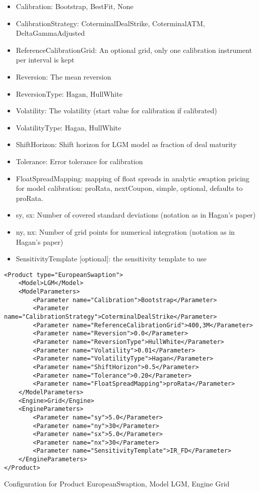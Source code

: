 \begin{itemize}
\item Calibration: Bootstrap, BestFit, None
\item CalibrationStrategy: CoterminalDealStrike, CoterminalATM, DeltaGammaAdjusted
\item ReferenceCalibrationGrid: An optional grid, only one calibration instrument per interval is kept
\item Reversion: The mean reversion
\item ReversionType: Hagan, HullWhite
\item Volatility: The volatility (start value for calibration if calibrated)
\item VolatilityType: Hagan, HullWhite
\item ShiftHorizon: Shift horizon for LGM model as fraction of deal maturity
\item Tolerance: Error tolerance for calibration
\item FloatSpreadMapping: mapping of float spreads in analytic swaption pricing for model calibration: proRata,
  nextCoupon, simple, optional, defaults to proRata.
\item sy, sx: Number of covered standard deviations (notation as in Hagan's paper)
\item ny, nx: Number of grid points for numerical integration (notation as in Hagan's paper)
\item SensitivityTemplate [optional]: the sensitivity template to use 
\end{itemize}

\begin{longlisting}
\begin{verbatim}
<Product type="EuropeanSwaption">
    <Model>LGM</Model>
    <ModelParameters>
        <Parameter name="Calibration">Bootstrap</Parameter>
        <Parameter name="CalibrationStrategy">CoterminalDealStrike</Parameter>
        <Parameter name="ReferenceCalibrationGrid">400,3M</Parameter>
        <Parameter name="Reversion">0.0</Parameter>
        <Parameter name="ReversionType">HullWhite</Parameter>
        <Parameter name="Volatility">0.01</Parameter>
        <Parameter name="VolatilityType">Hagan</Parameter>
        <Parameter name="ShiftHorizon">0.5</Parameter>
        <Parameter name="Tolerance">0.20</Parameter>
        <Parameter name="FloatSpreadMapping">proRata</Parameter>
    </ModelParameters>
    <Engine>Grid</Engine>
    <EngineParameters>
        <Parameter name="sy">5.0</Parameter>
        <Parameter name="ny">30</Parameter>
        <Parameter name="sx">5.0</Parameter>
        <Parameter name="nx">30</Parameter>
        <Parameter name="SensitivityTemplate">IR_FD</Parameter>
    </EngineParameters>
</Product>
\end{verbatim}
\caption{Configuration for Product EuropeanSwaption, Model LGM, Engine Grid}
\label{lst:peconfig_EuropeanSwaption_LGM_Grid}
\end{longlisting}


